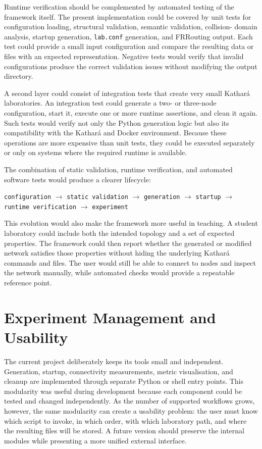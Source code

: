 Runtime verification should be complemented by automated testing of the
framework itself. The present implementation could be covered by unit tests for
configuration loading, structural validation, semantic validation, collision-
domain analysis, startup generation, \texttt{lab.conf} generation, and
FRRouting output. Each test could provide a small input configuration and
compare the resulting data or files with an expected representation. Negative
tests would verify that invalid configurations produce the correct validation
issues without modifying the output directory.

A second layer could consist of integration tests that create very small
Kathar\'a laboratories. An integration test could generate a two- or three-node
configuration, start it, execute one or more runtime assertions, and clean it
again. Such tests would verify not only the Python generation logic but also
its compatibility with the Kathar\'a and Docker environment. Because these
operations are more expensive than unit tests, they could be executed
separately or only on systems where the required runtime is available.

The combination of static validation, runtime verification, and automated
software tests would produce a clearer lifecycle:

\begin{center}
\texttt{configuration} $\rightarrow$ \texttt{static validation}
$\rightarrow$ \texttt{generation} $\rightarrow$ \texttt{startup}
$\rightarrow$ \texttt{runtime verification} $\rightarrow$
\texttt{experiment}
\end{center}

This evolution would also make the framework more useful in teaching. A
student laboratory could include both the intended topology and a set of
expected properties. The framework could then report whether the generated or
modified network satisfies those properties without hiding the underlying
Kathar\'a commands and files. The user would still be able to connect to nodes
and inspect the network manually, while automated checks would provide a
repeatable reference point.

\section{Experiment Management and Usability}
\label{sec:future-experiment-management}

The current project deliberately keeps its tools small and independent.
Generation, startup, connectivity measurements, metric visualisation, and
cleanup are implemented through separate Python or shell entry points. This
modularity was useful during development because each component could be tested
and changed independently. As the number of supported workflows grows,
however, the same modularity can create a usability problem: the user must know
which script to invoke, in which order, with which laboratory path, and where
the resulting files will be stored. A future version should preserve the
internal modules while presenting a more unified external interface.

